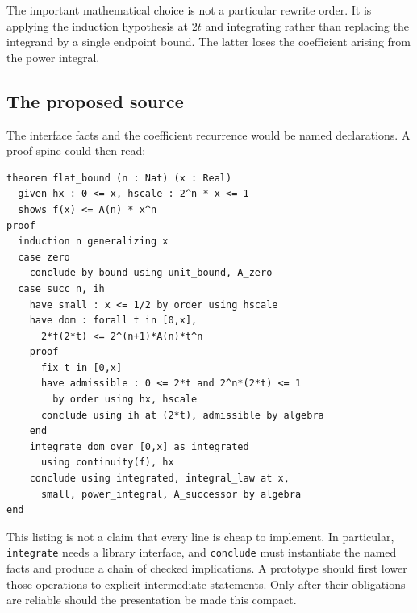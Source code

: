\documentclass[11pt,a4paper]{article}
\newcommand{\code}[1]{\texttt{\small #1}}
\theoremstyle{definition}
\theoremstyle{remark}
\begin{document}
The important mathematical choice is not a particular rewrite order. It is applying the induction hypothesis at $2t$ and integrating rather than replacing the integrand by a single endpoint bound. The latter loses the coefficient arising from the power integral.

\subsection{The proposed source}
The interface facts and the coefficient recurrence would be named declarations. A proof spine could then read:
\begin{lstlisting}
theorem flat_bound (n : Nat) (x : Real)
  given hx : 0 <= x, hscale : 2^n * x <= 1
  shows f(x) <= A(n) * x^n
proof
  induction n generalizing x
  case zero
    conclude by bound using unit_bound, A_zero
  case succ n, ih
    have small : x <= 1/2 by order using hscale
    have dom : forall t in [0,x],
      2*f(2*t) <= 2^(n+1)*A(n)*t^n
    proof
      fix t in [0,x]
      have admissible : 0 <= 2*t and 2^n*(2*t) <= 1
        by order using hx, hscale
      conclude using ih at (2*t), admissible by algebra
    end
    integrate dom over [0,x] as integrated
      using continuity(f), hx
    conclude using integrated, integral_law at x,
      small, power_integral, A_successor by algebra
end
\end{lstlisting}

This listing is not a claim that every line is cheap to implement. In particular, \code{integrate} needs a library interface, and \code{conclude} must instantiate the named facts and produce a chain of checked implications. A prototype should first lower those operations to explicit intermediate statements. Only after their obligations are reliable should the presentation be made this compact.
\end{document}
